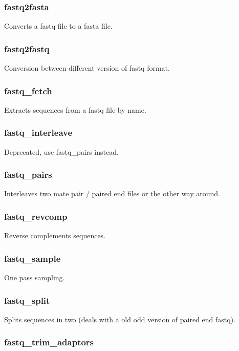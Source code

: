 \documentclass[a4paper,12pt]{article}
\begin{document}
\subsubsection{fastq2fasta}

Converts a fastq file to a fasta file.

\subsubsection{fastq2fastq}

Conversion between different version of fastq format.

\subsubsection{fastq\_fetch}

Extracts sequences from a fastq file by name.

\subsubsection{fastq\_interleave}

Deprecated, use fastq\_pairs instead.

\subsubsection{fastq\_pairs}

Interleaves two mate pair / paired end files or the other way around.

\subsubsection{fastq\_revcomp}

Reverse complements sequences.

\subsubsection{fastq\_sample}

One pass sampling.

\subsubsection{fastq\_split}

Splits sequences in two (deals with a old odd version of paired end fastq).

\subsubsection{fastq\_trim\_adaptors}
\end{document}
